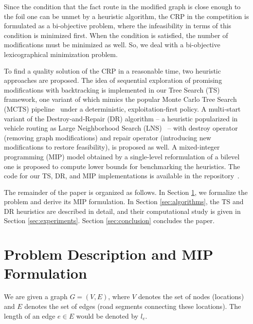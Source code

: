 \documentclass{article}
\begin{document}
Since the condition that the fact route in the modified graph is close enough to the foil one can be unmet by a heuristic algorithm, the CRP in the competition is formulated as a bi-objective problem, where the infeasibility in terms of this condition is minimized first.
When the condition is satisfied, the number of modifications must be minimized as well. 
So, we deal with a bi-objective lexicographical minimization problem. 

To find a quality solution of the CRP in a reasonable time, two heuristic approaches are proposed. 
The idea of sequential exploration of promising modifications with backtracking is implemented in our Tree Search (TS) framework, one variant of which mimics the popular Monte Carlo Tree Search (MCTS) pipeline~\cite{browne-et-al:survey-mcts} under a deterministic, exploitation‑first policy.
A multi‑start variant of the Destroy‑and‑Repair (DR) algorithm -- a heuristic popularized in vehicle routing as Large Neighborhood Search (LNS)~\cite{pisinger-ropke:lns} -- with destroy operator (removing graph modifications) and repair operator (introducing new modifications to restore feasibility), is proposed as well.
A mixed-integer programming (MIP) model obtained by a single-level reformulation of a bilevel one is proposed to compute lower bounds for benchmarking the heuristics. The code for our TS, DR, and MIP implementations is available in the repository~\cite{codebase}.

The remainder of the paper is organized as follows.
In Section \ref{sec:problem}, we formalize the problem and derive its MIP formulation.
In Section \ref{sec:algorithms}, the TS and DR heuristics are described in detail, and their computational study is given in Section \ref{sec:experiments}.
Section \ref{sec:conclusion} concludes the paper.

\section{Problem Description and MIP Formulation}
\label{sec:problem}

We are given a graph $G = (V,E)$, where $V$ denotes the set of nodes (locations) and $E$ denotes the set of edges (road segments connecting these locations). 
The length of an edge $e\in E$ would be denoted by $l_e$. 
\end{document}
